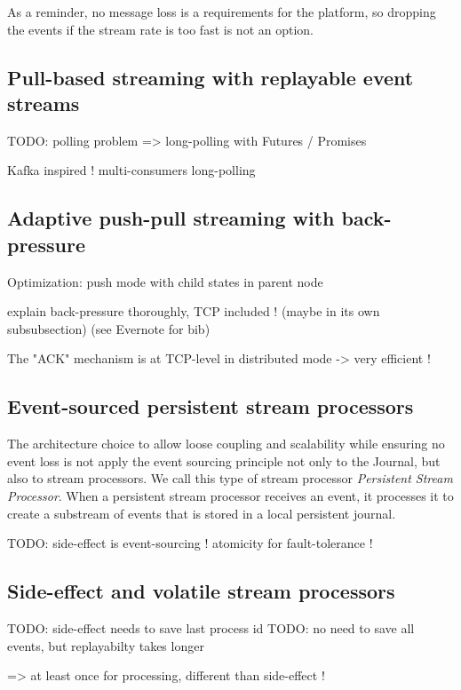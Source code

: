 As a reminder, no message loss is a requirements for the platform, so dropping the events if the stream rate is too fast is not an option.
\\

\subsection{Pull-based streaming with replayable event streams}

TODO: polling problem => long-polling with Futures / Promises

Kafka inspired ! multi-consumers long-polling

\subsection{Adaptive push-pull streaming with back-pressure}

Optimization: push mode with child states in parent node

explain back-pressure thoroughly, TCP included ! (maybe in its own subsubsection) (see Evernote for bib)

The "ACK" mechanism is at TCP-level in distributed mode -> very efficient !

\subsection{Event-sourced persistent stream processors}

The architecture choice to allow loose coupling and scalability while ensuring no event loss is not apply the event sourcing principle not only to the Journal, but also to 
stream processors. We call this type of stream processor \textit{Persistent Stream Processor}. When a persistent stream processor receives an event, it processes it 
to create a substream of events that is stored in a local persistent journal.

TODO: side-effect is event-sourcing ! atomicity for fault-tolerance !

\subsection{Side-effect and volatile stream processors}

TODO: side-effect needs to save last process id
TODO: no need to save all events, but replayabilty takes longer

=> at least once for processing, different than side-effect !

